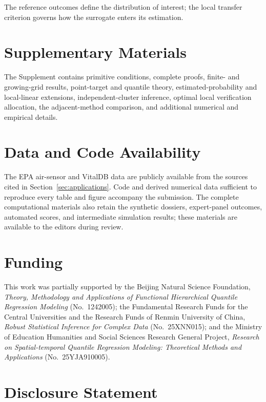 The reference outcomes define the distribution of interest; the local transfer
criterion governs how the surrogate enters its estimation.

\section*{Supplementary Materials}

The Supplement contains primitive conditions, complete proofs, finite- and growing-grid results, point-target and quantile theory, estimated-probability and local-linear extensions, independent-cluster inference, optimal local verification allocation, the adjacent-method comparison, and additional numerical and empirical details.

\section*{Data and Code Availability}

The EPA air-sensor and VitalDB data are publicly available from the sources
cited in Section~\ref{sec:applications}. Code and derived numerical data
sufficient to reproduce every table and figure accompany the submission. The
complete computational materials also retain the synthetic dossiers,
expert-panel outcomes, automated scores, and intermediate simulation results;
these materials are available to the editors during review.

\ifblinded
\else
\section*{Funding}

This work was partially supported by the Beijing Natural Science Foundation, \emph{Theory, Methodology and Applications of Functional Hierarchical Quantile Regression Modeling} (No.~1242005); the Fundamental Research Funds for the Central Universities and the Research Funds of Renmin University of China, \emph{Robust Statistical Inference for Complex Data} (No.~25XNN015); and the Ministry of Education Humanities and Social Sciences Research General Project, \emph{Research on Spatial-temporal Quantile Regression Modeling: Theoretical Methods and Applications} (No.~25YJA910005).
\fi

\section*{Disclosure Statement}

